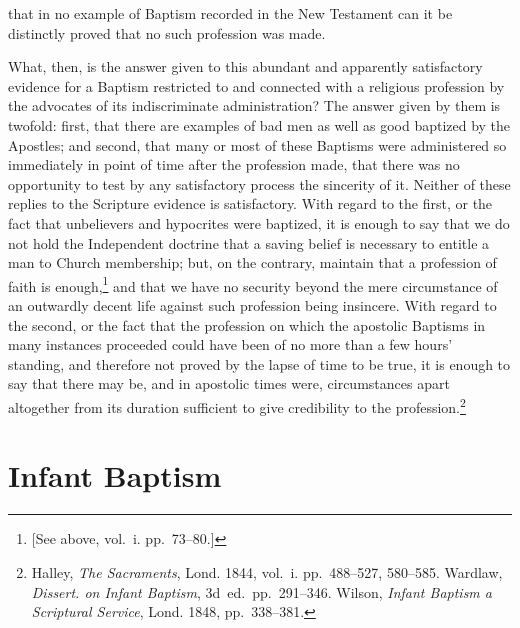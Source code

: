 \documentclass[
]{book}
\begin{document}
that in no example of Baptism recorded in the New Testament can it be distinctly proved that no such profession was made.

What, then, is the answer given to this abundant and apparently satisfactory evidence for a Baptism restricted to and connected with a religious profession by the advocates of its indiscriminate administration? The answer given by them is twofold: first, that there are examples of bad men as well as good baptized by the Apostles; and second, that many or most of these Baptisms were administered so immediately in point of time after the profession made, that there was no opportunity to test by any satisfactory process the sincerity of it. Neither of these replies to the Scripture evidence is satisfactory. With regard to the first, or the fact that unbelievers and hypocrites were baptized, it is enough to say that we do not hold the Independent doctrine that a saving belief is necessary to entitle a man to Church membership; but, on the contrary, maintain that a profession of faith is enough,\footnote{{[}See above, vol.~i. pp.~73--80.{]}} and that we have no security beyond the mere circumstance of an outwardly decent life against such profession being insincere. With regard to the second, or the fact that the profession on which the apostolic Baptisms in many instances proceeded could have been of no more than a few hours' standing, and therefore not proved by the lapse of time to be true, it is enough to say that there may be, and in apostolic times were, circumstances apart altogether from its duration sufficient to give credibility to the profession.\footnote{Halley, \emph{The Sacraments}, Lond. 1844, vol.~i. pp.~488--527, 580--585. Wardlaw, \emph{Dissert. on Infant Baptism}, 3d~ed.~pp.~291--346. Wilson, \emph{Infant Baptism a Scriptural Service}, Lond. 1848, pp.~338--381.}

\hypertarget{infant-baptism}{%
\section{Infant Baptism}\label{infant-baptism}}
\end{document}
